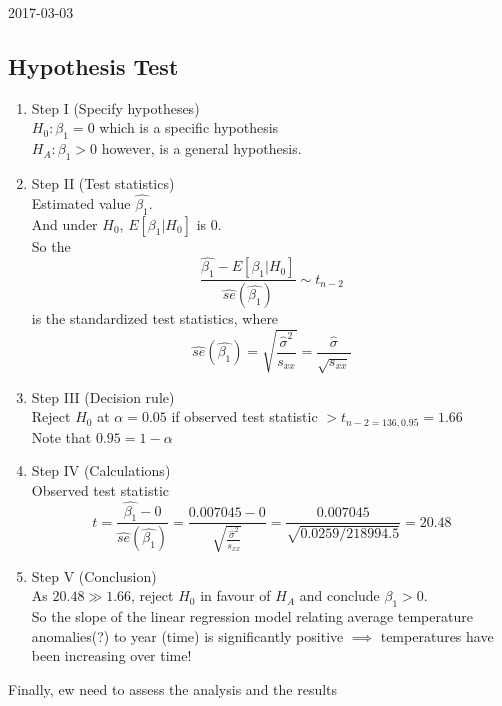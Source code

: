 \documentclass[a4paper, 11pt, twoside]{article}
\begin{document}
2017-03-03\\

\subsection{Hypothesis Test}

\begin{enumerate}
	\item Step I (Specify hypotheses)\\ 
		$H_0: \beta_1 = 0$ which is a specific hypothesis\\ 
		$H_A: \beta_1 > 0$ however, is a general hypothesis.
	\item Step II (Test statistics)\\
		Estimated value $\hat{\beta_1}$.\\
		And under $H_0$, $E[\beta_1|H_0]$ is $0$. \\
		So the \[\frac{\hat{\beta_1} - E[\beta_1|H_0]}{\hat{se}(\hat{\beta_1})}\sim t_{n-2}\]
		is the standardized test statistics, where \[\hat{se}(\hat{\beta_1}) = \sqrt{\frac{\hat{\sigma}^2}{s_{xx}}}=\frac{\hat{\sigma}}{\sqrt{s_{xx}}}\]
	\item Step III (Decision rule)\\
		Reject $H_0$ at $\alpha=0.05$ if observed test statistic $> t_{n-2=136, 0.95}=1.66$\\
		Note that $0.95=1-\alpha$
	\item Step IV (Calculations)\\
		Observed test statistic
		\[t=\frac{\hat{\beta_1}-0}{\hat{se}(\hat{\beta_1})}=\frac{0.007045-0}{\sqrt{\frac{\hat{\sigma}^2}{s_{xx}}}} = \frac{0.007045}{\sqrt{0.0259/218994.5}} = 20.48\]
	\item Step V (Conclusion)\\
		As $20.48 \gg 1.66$, reject $H_0$ in favour of $H_A$ and conclude $\beta_1>0.$\\
		So the slope of the linear regression model relating average temperature anomalies(?) to year (time) is significantly positive $\implies$ temperatures have been increasing over time!\\
\end{enumerate}

Finally, ew need to assess the analysis and the results
\end{document}
